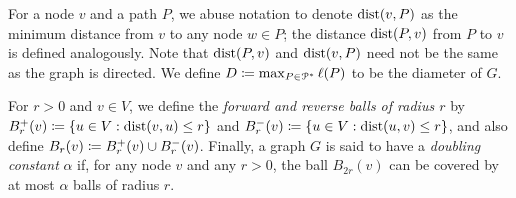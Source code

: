 For a node $v$ and a path $P$, we abuse notation to denote $\mbox{dist}(v,P)$ as the minimum distance from $v$ to any node $w\in P$; the distance $\mbox{dist}(P,v)$ from $P$ to $v$ is defined analogously.
Note that  $\mbox{dist}(P,v)$ and  $\mbox{dist}(v,P)$ need not be the same as the graph is directed.
We define $D\coloneqq\max_{P\in\mathcal{P}^*}\ell(P)$ to be the diameter of $G$.


For $r>0$ and $v\in V$, we define the \emph{forward and reverse balls of radius $r$} by $B^+_r(v)\coloneqq\{u\in V: \mbox{dist}(v,u)\leq r\}$ and $B^-_r(v)\coloneqq\{u\in V: \mbox{dist}(u,v)\leq r\}$, and also define $B_r(v)\coloneqq B^+_r(v)\cup B^-_r(v)$.
Finally, a graph $G$ is said to have a \emph{doubling constant} $\alpha$ if, for any node $v$ and any $r>0$, the ball $B_{2r}(v)$ can be covered by at most $\alpha$ balls of radius $r$.